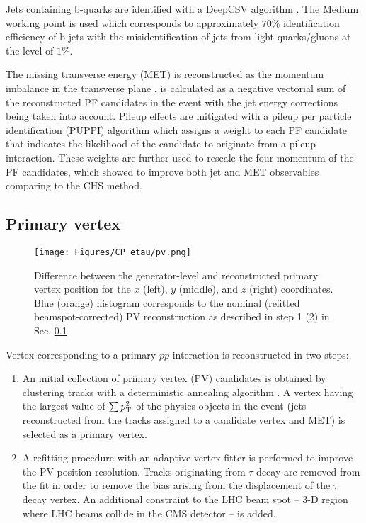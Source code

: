 Jets containing b-quarks are identified with a DeepCSV algorithm \cite{CMS:2017wtu}. The Medium working point is used which corresponds to approximately $70\%$ identification efficiency of b-jets with the misidentification of jets from light quarks/gluons at the level of $1\%$.

The missing transverse energy (MET) \met is reconstructed as the momentum imbalance in the transverse plane \cite{CMS:2019ctu}. \met is calculated as a negative vectorial sum of the reconstructed PF candidates in the event with the jet energy corrections being taken into account. Pileup effects are mitigated with a pileup per particle identification (PUPPI) algorithm \cite{Bertolini:2014bba} which assigns a weight to each PF candidate that indicates the likelihood of the candidate to originate from a pileup interaction. These weights are further used to rescale the four-momentum of the PF candidates, which showed to improve both jet and MET observables comparing to the CHS method.

\subsection{Primary vertex}\label{sec:pv}

\begin{figure}[t!]
    \centering
    \texttt{[image: Figures/CP\_etau/pv.png]}
    \caption{Difference between the generator-level and reconstructed primary vertex position for the $x$ (left), $y$ (middle), and $z$ (right) coordinates. Blue (orange) histogram corresponds to the nominal (refitted beamspot-corrected) PV reconstruction as described in step 1 (2) in Sec. \ref{sec:pv}}
    \label{fig:pv}
\end{figure}
 Vertex corresponding to a primary $pp$ interaction is reconstructed in two steps:
\begin{enumerate}
    \item An initial collection of primary vertex (PV) candidates is obtained by clustering tracks with a deterministic annealing algorithm \cite{726788}. A vertex having the largest value of $\sum p_{\text{T}}^2$ of the physics objects in the event (jets reconstructed from the tracks assigned to a candidate vertex and MET) is selected as a primary vertex.
    \item A refitting procedure with an adaptive vertex fitter \cite{Fruhwirth:2007hz} is performed to improve the PV position resolution. Tracks originating from $\tau$ decay are removed from the fit in order to remove  the bias arising from the displacement of the $\tau$ decay vertex. An additional constraint to the LHC beam spot -- 3-D region where LHC beams collide in the CMS detector -- is added.
\end{enumerate}

